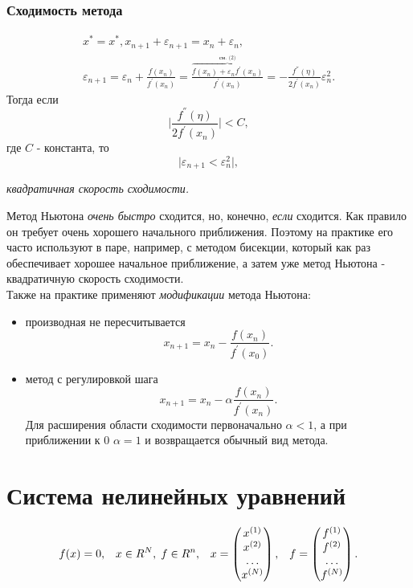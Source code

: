 \documentclass[a4paper,11pt]{article}
\begin{document}
\subsubsection{Сходимость метода}
\begin{gather*}
  x^* = x^*, x_{n+1}+\varepsilon_{n+1} = x_n+\varepsilon_n, \\
  \varepsilon_{n+1} = \varepsilon_n + \frac{f(x_n)}{f^{'}(x_n)} = \frac{\overbrace{f(x_n) + \varepsilon_nf^{'}(x_n)}^{\text{см. ($2$)}}}{f^{'}(x_n)} =
  -\frac{f^{''}(\eta)}{2f^{'}(x_n)}\varepsilon_n^2.
\end{gather*}
Тогда если \[\bigg| \frac{f^{''}(\eta)}{2f^{'}(x_n)} \bigg| < C,\] где $C$ - константа, то
\begin{equation}
  \bigg| \varepsilon_{n+1} < \varepsilon_n^2 \bigg|,
\end{equation}
\begin{center}
  \small \textit{квадратичная скорость сходимости.}
\end{center}

\noindent Метод Ньютона \textit{очень быстро} сходится, но, конечно, \textit{если} сходится. Как правило он требует очень хорошего начального приближения.
Поэтому на практике его часто используют в паре, например, с методом бисекции, который как раз обеспечивает хорошее начальное приближение,
а затем уже метод Ньютона - квадратичную скорость сходимости. \\

\noindent Также на практике применяют \textit{модификации} метода Ньютона:
\begin{itemize}
  \item производная не пересчитывается \[x_{n+1} = x_n - \frac{f(x_n)}{f^{'}(x_0)}.\]
  \item метод с регулировкой шага \[x_{n+1} = x_n - \alpha\frac{f(x_n)}{f^{'}(x_n)}.\]
    Для расширения области сходимости первоначально $\alpha<1$, а при приближении к $0$ $\alpha=1$ и возвращается обычный вид метода.
\end{itemize}

\section{Система нелинейных уравнений}
\begin{align}
  f(x) = 0, && x \in R^N, \hspace{1mm}f \in R^n, && x = \begin{pmatrix} x^{(1)} \\ x^{(2)} \\ \dots \\ x^{(N)} \end{pmatrix}, &&
  f = \begin{pmatrix} f^{(1)} \\ f^{(2)} \\ \dots \\ f^{(N)} \end{pmatrix}.
\end{align}
\end{document}

